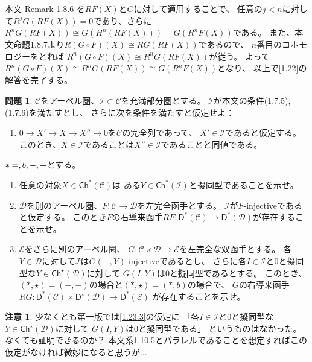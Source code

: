 \documentclass[uplatex,dvipdfmx]{jsarticle}
\makeatletter
\theoremstyle{definition}
\newtheorem{prob}[prob]{問題}
\newtheorem*{rem*}{注意}
\renewenvironment{proof}[1][\proofname]{
  \pushQED{\qed}%
  \normalfont \topsep6\p@\@plus6\p@\relax
  \trivlist
  \item[\hskip\labelsep
    #1\@addpunct{\textbf{.}}]\ignorespaces
}{%
  \popQED\endtrivlist\@endpefalse
}
\providecommand{\proofname}{証明}
\newcommand{\Ch}{\mathsf{Ch}}
\newcommand{\sfD}{\mathsf{D}}
\newcommand\mcC{\mathcal{C}}
\newcommand\mcD{\mathcal{D}}
\newcommand\mcE{\mathcal{E}}
\newcommand\mcI{\mathcal{I}}
\makeatother
\begin{document}
\begin{proof}
  本文 Remark 1.8.6 を\(RF(X)\)と\(G\)に対して適用することで、
  任意の\(j<n\)に対して\(R^jG(RF(X)) = 0\)であり、さらに
  \(R^nG(RF(X)) \cong G(H^n(RF(X))) = G(R^nF(X))\)である。
  また、本文命題1.8.7より\(R(G\circ F)(X) \cong RG(RF(X))\)であるので、
  \(n\)番目のコホモロジーをとれば
  \(R^n(G\circ F)(X) \cong R^nG(RF(X))\)が従う。
  よって\(R^n(G\circ F)(X) \cong R^nG(RF(X))\cong G(R^nF(X))\)となり、
  以上で\autoref{1.22}の解答を完了する。
\end{proof}








\begin{prob}\label{1.23}
  \(\mcC\)をアーベル圏、\(\mcI\subset \mcC\)を充満部分圏とする。
  \(\mcI\)が本文の条件(1.7.5),(1.7.6)を満たすとし、
  さらに次を条件を満たすと仮定せよ：
  \begin{enumerate}[label=(\fnsymbol*),start=2]
    \item \label{1.23.c}
    \(0\to X'\to X\to X''\to 0\)を\(\mcC\)の完全列であって、
    \(X'\in \mcI\)であると仮定する。
    このとき、\(X\in \mcI\)であることは\(X''\in \mcI\)であることと同値である。
  \end{enumerate}
  \(*=\empty,b,-,+\)とする。
  \begin{enumerate}
    \item \label{1.23.1}
    任意の対象\(X\in \Ch^*(\mcC)\)は
    ある\(Y\in \Ch^*(\mcI)\)と擬同型であることを示せ。
    \item \label{1.23.2}
    \(\mcD\)を別のアーベル圏、\(F:\mcC\to \mcD\)を左完全函手とする。
    \(\mcI\)が\(F\)-injectiveであると仮定する。
    このとき\(F\)の右導来函手\(RF:\sfD^*(\mcC)\to \sfD^*(\mcD)\)が存在することを示せ。
    \item \label{1.23.3}
    \(\mcE\)をさらに別のアーベル圏、
    \(G:\mcC\times \mcD \to \mcE\)を左完全な双函手とする。
    各\(Y\in \mcD\)に対して\(\mcI\)は\(G(-,Y)\)-injectiveであるとし、
    さらに各\(I\in \mcI\)と\(0\)と擬同型な\(Y\in \Ch^{\star}(\mcD)\)に対して
    \(G(I,Y)\)は\(0\)と擬同型であるとする。
    このとき、\((*,\star) = (-,-)\)の場合と\((*,\star) = (*,b)\)の場合で、
    \(G\)の右導来函手
    \(RG:\sfD^*(\mcC)\times \sfD^{\star}(\mcD) \to \sfD^*(\mcE)\)
    が存在することを示せ。
  \end{enumerate}
\end{prob}

\begin{rem*}
  少なくとも第一版では\ref{1.23.3}の仮定に
  「各\(I\in \mcI\)と\(0\)と擬同型な\(Y\in \Ch^{\star}(\mcD)\)に対して
  \(G(I,Y)\)は\(0\)と擬同型である」
  というものはなかった。
  なくても証明できるのか？
  本文系1.10.5とパラレルであることを想定すればこの仮定がなければ微妙になると思うが...
\end{rem*}
\end{document}
